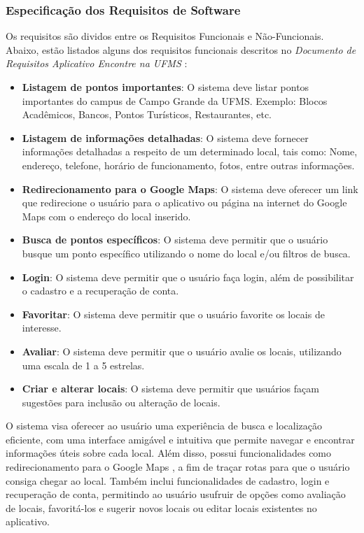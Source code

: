 \subsubsection{Especificação dos Requisitos de Software}

    Os requisitos são dividos entre os Requisitos Funcionais e Não-Funcionais. Abaixo, estão listados alguns dos requisitos funcionais descritos no \textit{Documento de Requisitos Aplicativo Encontre na UFMS} \cite{documentoRequisitosAplicativoEncontreNaUFMS}:
    
    \begin{itemize}
      \item \textbf{Listagem de pontos importantes}: O sistema deve listar pontos importantes do campus de Campo Grande da UFMS. Exemplo: Blocos Acadêmicos, Bancos, Pontos Turísticos, Restaurantes, etc.
      \item \textbf{Listagem de informações detalhadas}: O sistema deve fornecer informações detalhadas a respeito de um determinado local, tais como: Nome, endereço, telefone, horário de funcionamento, fotos, entre outras informações.
      \item \textbf{Redirecionamento para o Google Maps}:  O sistema deve oferecer um link que redirecione o usuário para o aplicativo ou página na internet do Google Maps \cite{maps2005} com o endereço do local inserido.
      \item \textbf{Busca de pontos específicos}: O sistema deve permitir que o usuário busque um ponto específico utilizando o nome do local e/ou filtros de busca.
      \item \textbf{Login}: O sistema deve permitir que o usuário faça login, além de possibilitar o cadastro e a recuperação de conta.
      \item \textbf{Favoritar}:  O sistema deve permitir que o usuário favorite os locais de interesse.
      \item \textbf{Avaliar}:  O sistema deve permitir que o usuário avalie os locais, utilizando uma escala de 1 a 5 estrelas.
      \item \textbf{Criar e alterar locais}: O sistema deve permitir que usuários façam sugestões para inclusão ou alteração de locais.
    \end{itemize}
    
    O sistema visa oferecer ao usuário uma experiência de busca e localização eficiente, com uma interface amigável e intuitiva que permite navegar e encontrar informações úteis sobre cada local. Além disso, possui funcionalidades como redirecionamento para o Google Maps \cite{maps2005}, a fim de traçar rotas para que o usuário consiga chegar ao local. Também inclui funcionalidades de cadastro, login e recuperação de conta, permitindo ao usuário usufruir de opções como avaliação de locais, favoritá-los e sugerir novos locais ou editar locais existentes no aplicativo.

